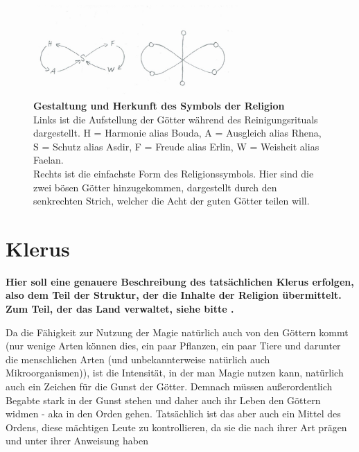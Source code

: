 \begin{figure}[tbh]
	\centering
	\includegraphics[width=0.7\textwidth]{Abbildungen/Gesellschaft/Religion/goettersymbol}
	\caption[Das Symbol der Götter]{\textbf{Gestaltung und Herkunft des Symbols der Religion}\\
	Links ist die Aufstellung der Götter während des Reinigungsrituals dargestellt. H = Harmonie alias Bouda, A = Ausgleich alias Rhena, S = Schutz alias Asdir, F = Freude alias Erlin, W = Weisheit alias Faelan.\\
	Rechts ist die einfachste Form des Religionssymbols. Hier sind die zwei bösen Götter hinzugekommen, dargestellt durch den senkrechten Strich, welcher die Acht der guten Götter teilen will.}
	\label{fig:goettersymbol}
\end{figure}












\clearpage
\newpage
\section{Klerus}\label{ch:klerus}
\textbf{Hier soll eine genauere Beschreibung des tatsächlichen Klerus erfolgen, also dem Teil der Struktur, der die Inhalte der Religion übermittelt. 
Zum Teil, der das Land verwaltet, siehe bitte .} 

Da die Fähigkeit zur Nutzung der Magie natürlich auch von den Göttern kommt (nur wenige Arten können dies, ein paar Pflanzen, ein paar Tiere und darunter die menschlichen Arten (und unbekannterweise natürlich auch Mikroorganismen)), ist die Intensität, in der man Magie nutzen kann, natürlich auch ein Zeichen für die Gunst der Götter. 
Demnach müssen außerordentlich Begabte stark in der Gunst stehen und daher auch ihr Leben den Göttern widmen - aka in den Orden gehen. 
Tatsächlich ist das aber auch ein Mittel des Ordens, diese mächtigen Leute zu kontrollieren, da sie die nach ihrer Art prägen und unter ihrer Anweisung haben

